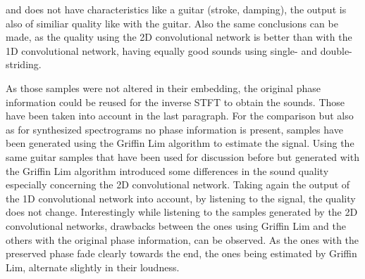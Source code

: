 and does not have characteristics like a guitar (stroke, damping), the output is also of similiar quality like with the guitar. Also the same conclusions can be made, as the quality using the 2D convolutional network is better than with the 1D convolutional network, having equally good sounds using single- and double-striding. 

As those samples were not altered in their embedding, the original phase information could be reused for the inverse STFT to obtain the sounds. Those have been taken into account in the last paragraph. For the comparison but also as for synthesized spectrograms no phase information is present, samples have been generated using the Griffin Lim algorithm \cite{Griffin1984} to estimate the signal. Using the same guitar samples that have been used for discussion before but generated with the Griffin Lim algorithm introduced some differences in the sound quality especially concerning the 2D convolutional network. Taking again the output of the 1D convolutional network into account, by listening to the signal, the quality does not change. Interestingly while listening to the samples generated by the 2D convolutional networks, drawbacks between the ones using Griffin Lim and the others with the original phase information, can be observed. As the ones with the preserved phase fade clearly towards the end, the ones being estimated by Griffin Lim, alternate slightly in their loudness.

